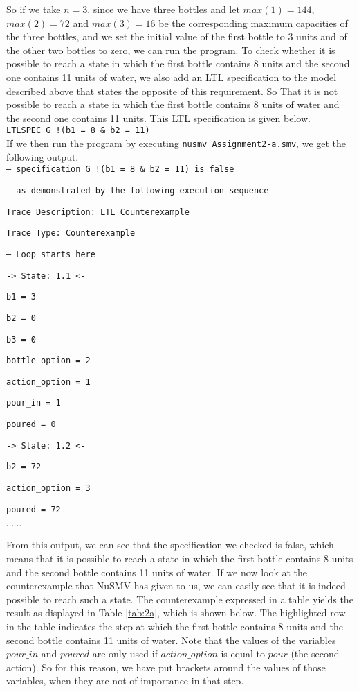 \documentclass[a4paper]{article}
\begin{document}
	So if we take $n=3$, since we have three bottles and let $max(1)=144$, $max(2)=72$ and $max(3)=16$ be the corresponding maximum capacities of the three bottles, and we set the initial value of the first bottle to 3 units and of the other two bottles to zero, we can run the program. To check whether it is possible to reach a state in which the first bottle contains 8 units and the second one contains 11 units of water, we also add an LTL specification to the model described above that states the opposite of this requirement. So That it is not possible to reach a state in which the first bottle contains 8 units of water and the second one contains 11 units. This LTL specification is given below.\\

{\tt LTLSPEC G !(b1 = 8 \& b2 = 11) }\\

If we then run the program by executing {\tt nusmv Assignment2-a.smv}, we get the following output.\\

{\tt -- specification  G !(b1 = 8 \& b2 = 11)  is false }

{\tt -- as demonstrated by the following execution sequence }

{\tt Trace Description: LTL Counterexample }

{\tt Trace Type: Counterexample }

{\tt   -- Loop starts here }

{\tt   -> State: 1.1 <- }

{\tt     b1 = 3 }

{\tt     b2 = 0 }

{\tt     b3 = 0 }

{\tt     bottle\_option = 2 }

{\tt     action\_option = 1 }

{\tt     pour\_in = 1 }

{\tt     poured = 0 }

{\tt   -> State: 1.2 <- }

{\tt     b2 = 72 }

{\tt     action\_option = 3 }

{\tt     poured = 72 }

$\cdots \cdots$

From this output, we can see that the specification we checked is false, which means that it is possible to reach a state in which the first bottle contains 8 units and the second bottle contains 11 units of water. If we now look at the counterexample that NuSMV has given to us, we can easily see that it is indeed possible to reach such a state. The counterexample expressed in a table yields the result as displayed in Table \ref{tab:2a}, which is shown below. The highlighted row in the table indicates the step at which the first bottle contains 8 units and the second bottle contains 11 units of water. Note that the values of the variables $pour\_in$ and $poured$ are only used if $action\_option$ is equal to $pour$ (the second action). So for this reason, we have put brackets around the values of those variables, when they are not of importance in that step.
\end{document}
